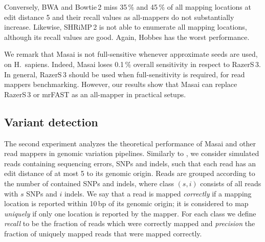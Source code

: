 Conversely, BWA and Bowtie\,2 miss 35\,\% and 45\,\% of all mapping locations at edit distance 5 and their recall values as all-mappers do not substantially increase.
Likewise, SHRiMP\,2 is not able to enumerate all mapping locations, although its recall values are good.
Again, Hobbes has the worst performance.

We remark that Masai is not full-sensitive whenever approximate seeds are used, \eg on H.~sapiens. Indeed, Masai loses 0.1\,\% overall sensitivity in respect to RazerS\,3.
In general, RazerS\,3 should be used when full-sensitivity is required, \ie for read mappers benchmarking. However, our results show that Masai can replace RazerS\,3 or mrFAST as an all-mapper in practical setups.

\begin{table*}[t]
  \caption[Rabema results]
  {
  \label{tab:Rabema}
    {\bfseries Rabema results.}
    Rabema scores in percent
    (average fraction of edit distance locations reported per read).
    Large numbers show total scores in each Rabema category and small numbers show the category scores separately for reads with $\bigl(\begin{smallmatrix}\mbox{\tiny 0}&\mbox{\tiny 1}&\mbox{\tiny 2}\\\mbox{\tiny 3}&\mbox{\tiny 4}&\mbox{\tiny 5}\end{smallmatrix}\bigr)$ errors.
    }
  \vspace{-3mm}
  \center
  \sffamily
  \resizebox{0.95\textwidth}{!}
  {
	\renewcommand{\tabcolsep}{0.8ex}
	
  }
\end{table*}

\subsection{Variant detection}

The second experiment analyzes the theoretical performance of Masai and other read mappers in genomic variation pipelines.
Similarly to \citep{Shrimp2}, we consider simulated reads containing sequencing errors, SNPs and indels, such that each read has an edit distance of at most 5 to its genomic origin.
Reads are grouped according to the number of contained SNPs and indels, where class $(s,i)$ consists of all reads with $s$ SNPs and $i$ indels.
We say that a read is mapped \emph{correctly} if a mapping location is reported within 10\,bp of its genomic origin;
it is considered to map \emph{uniquely} if only one location is reported by the mapper.
For each class we define \emph{recall} to be the fraction of reads which were correctly mapped and \emph{precision} the fraction of uniquely mapped reads that were mapped correctly.

